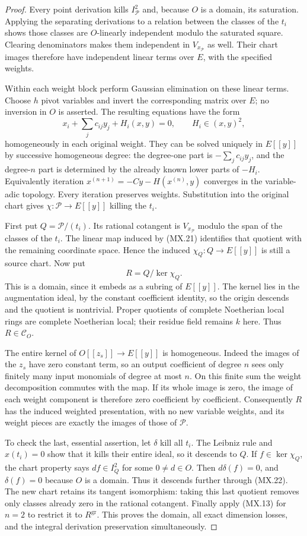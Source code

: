 \begin{proof}
Every point derivation kills $I_{\mathcal P}^2$ and,
because $O$ is a domain, its saturation.  Applying the
separating derivations to a relation between the classes
of the $t_i$ shows those classes are $O$-linearly independent
modulo the saturated square.  Clearing denominators makes
them independent in $V_{x_{\mathcal P}}$ as well.
Their chart images therefore have independent linear terms
over $E$, with the specified weights.

Within each weight block perform Gaussian elimination on
these linear terms.  Choose $h$ pivot variables and
invert the corresponding matrix over $E$; no inversion in
$O$ is asserted.  The resulting equations have the form
\[
       x_i+\sum_j c_{ij}y_j+H_i(x,y)=0,
                   \qquad H_i\in(x,y)^2,
 \tag{MX.21}
\]
homogeneously in each original weight.  They can be solved
uniquely in $E[[y]]$ by successive homogeneous degree:
the degree-one part is $-\sum_jc_{ij}y_j$, and the
degree-$n$ part is determined by the already known lower
parts of $-H_i$.  Equivalently iteration
$x^{(n+1)}=-Cy-H(x^{(n)},y)$ converges in the variable-adic
topology.  Every iteration preserves weights.
Substitution into the original chart gives
$\chi:\mathcal P\to E[[y]]$ killing the $t_i$.

First put $Q=\mathcal P/(t_i)$.  Its rational cotangent
is $V_{x_{\mathcal P}}$ modulo the span of the classes of
the $t_i$.  The linear map induced by (MX.21) identifies
that quotient with the remaining coordinate space.
Hence the induced $\chi_Q:Q\to E[[y]]$ is still a source
chart.  Now put
\[
                  R=Q/\ker\chi_Q.
 \tag{MX.22}
\]
This is a domain, since it embeds as a subring of $E[[y]]$.
The kernel lies in the augmentation ideal, by the constant
coefficient identity, so the origin descends and the
quotient is nontrivial.  Proper quotients of complete
Noetherian local rings are complete Noetherian local;
their residue field remains $k$ here.  Thus $R\in\mathcal C_O$.

The entire kernel of $O[[z_s]]\to E[[y]]$ is homogeneous.
Indeed the images of the $z_s$ have zero constant term, so
an output coefficient of degree $n$ sees only finitely
many input monomials of degree at most $n$.  On this finite
sum the weight decomposition commutes with the map.
If its whole image is zero, the image of each weight
component is therefore zero coefficient by coefficient.
Consequently $R$ has the induced weighted presentation,
with no new variable weights, and its weight pieces are
exactly the images of those of $\mathcal P$.

To check the last, essential assertion, let $\delta$ kill
all $t_i$.  The Leibniz rule and $x(t_i)=0$ show that it
kills their entire ideal, so it descends to $Q$.
If $f\in\ker\chi_Q$, the chart property says
$df\in I_Q^2$ for some $0\ne d\in O$.
Then $d\delta(f)=0$, and $\delta(f)=0$ because $O$ is
a domain.  Thus it descends further through (MX.22).
The new chart retains its tangent isomorphism: taking
this last quotient removes only classes already zero in
the rational cotangent.  Finally apply (MX.13) for $n=2$
to restrict it to $R^{\mathrm{gr}}$.
This proves the domain, all exact dimension losses, and
the integral derivation preservation simultaneously.
\end{proof}
